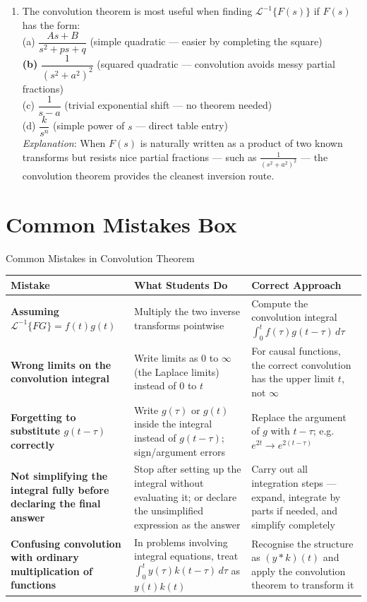 \documentclass[12pt,a4paper]{article}
\begin{document}
\begin{enumerate}[label=\textbf{MCQ \arabic*.}, leftmargin=*, itemsep=12pt]
\item The convolution theorem is most useful when finding $\mathcal{L}^{-1}\{F(s)\}$ if
$F(s)$ has the form:\\
(a) $\dfrac{As+B}{s^2+ps+q}$ (simple quadratic --- easier by completing the square)\\
\textbf{(b)} $\dfrac{1}{(s^2+a^2)^2}$ (squared quadratic --- convolution avoids messy partial fractions)\\
(c) $\dfrac{1}{s-a}$ (trivial exponential shift --- no theorem needed)\\
(d) $\dfrac{k}{s^n}$ (simple power of $s$ --- direct table entry) \\[2pt]
\textit{Explanation}: When $F(s)$ is naturally written as a product of two known transforms but
resists nice partial fractions --- such as $\frac{1}{(s^2+a^2)^2}$ --- the convolution theorem
provides the cleanest inversion route.

\end{enumerate}

\section{Common Mistakes Box}

\begin{mistakebox}{Common Mistakes in Convolution Theorem}
\begin{tabular}{>{\bfseries}p{4.5cm} p{4.5cm} p{5cm}}
\toprule
\textbf{Mistake} & \textbf{What Students Do} & \textbf{Correct Approach} \\
\midrule
Assuming $\mathcal{L}^{-1}\{FG\}=f(t)g(t)$
  & Multiply the two inverse transforms pointwise
  & Compute the convolution integral $\int_0^t f(\tau)g(t-\tau)\,d\tau$ \\
\midrule
Wrong limits on the convolution integral
  & Write limits as $0$ to $\infty$ (the Laplace limits) instead of $0$ to $t$
  & For causal functions, the correct convolution has the upper limit $t$, not $\infty$ \\
\midrule
Forgetting to substitute $g(t-\tau)$ correctly
  & Write $g(\tau)$ or $g(t)$ inside the integral instead of $g(t-\tau)$; sign/argument errors
  & Replace the argument of $g$ with $t-\tau$; e.g.\ $e^{2t}\to e^{2(t-\tau)}$ \\
\midrule
Not simplifying the integral fully before declaring the final answer
  & Stop after setting up the integral without evaluating it; or declare the unsimplified expression as the answer
  & Carry out all integration steps --- expand, integrate by parts if needed, and simplify completely \\
\midrule
Confusing convolution with ordinary multiplication of functions
  & In problems involving integral equations, treat $\int_0^t y(\tau)k(t-\tau)\,d\tau$ as $y(t)k(t)$
  & Recognise the structure as $(y*k)(t)$ and apply the convolution theorem to transform it \\
\bottomrule
\end{tabular}
\end{mistakebox}
\end{document}
